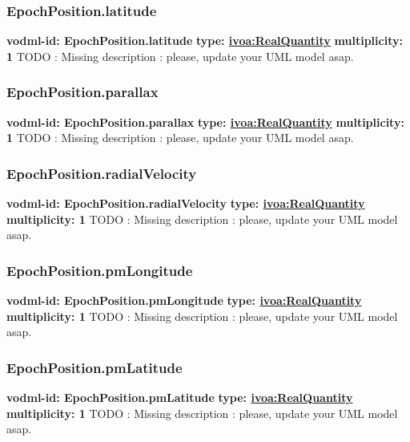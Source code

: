     \subsubsection{EpochPosition.latitude}
      \textbf{vodml-id: EpochPosition.latitude} \newline
      \textbf{type: \hyperref[sect:ivoa]{ivoa:RealQuantity}} \newline
      \textbf{multiplicity: 1} \newline 
      TODO : Missing description : please, update your UML model asap.

    \subsubsection{EpochPosition.parallax}
      \textbf{vodml-id: EpochPosition.parallax} \newline
      \textbf{type: \hyperref[sect:ivoa]{ivoa:RealQuantity}} \newline
      \textbf{multiplicity: 1} \newline 
      TODO : Missing description : please, update your UML model asap.

    \subsubsection{EpochPosition.radialVelocity}
      \textbf{vodml-id: EpochPosition.radialVelocity} \newline
      \textbf{type: \hyperref[sect:ivoa]{ivoa:RealQuantity}} \newline
      \textbf{multiplicity: 1} \newline 
      TODO : Missing description : please, update your UML model asap.

    \subsubsection{EpochPosition.pmLongitude}
      \textbf{vodml-id: EpochPosition.pmLongitude} \newline
      \textbf{type: \hyperref[sect:ivoa]{ivoa:RealQuantity}} \newline
      \textbf{multiplicity: 1} \newline 
      TODO : Missing description : please, update your UML model asap.

    \subsubsection{EpochPosition.pmLatitude}
      \textbf{vodml-id: EpochPosition.pmLatitude} \newline
      \textbf{type: \hyperref[sect:ivoa]{ivoa:RealQuantity}} \newline
      \textbf{multiplicity: 1} \newline 
      TODO : Missing description : please, update your UML model asap.

